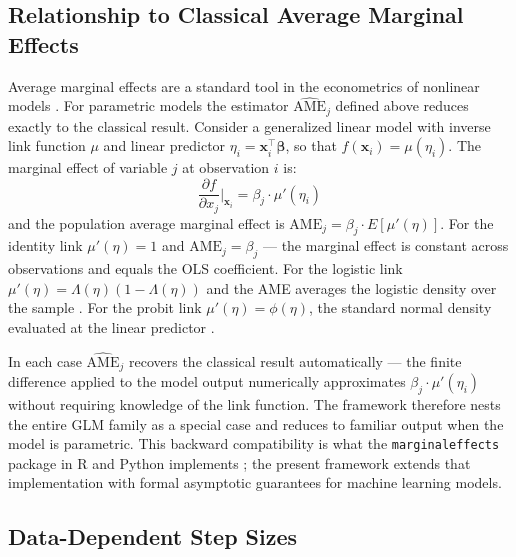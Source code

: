 \documentclass[12pt,a4paper]{article}
\numberwithin{equation}{section}
\theoremstyle{plain}
\theoremstyle{definition}
\begin{document}
	\subsection{Relationship to Classical Average Marginal Effects}

	
	Average marginal effects are a standard tool in the econometrics of nonlinear models \citep{greene2012, wooldridge2010}. For parametric models the estimator $\widehat{\mathrm{AME}}_j$ defined above reduces exactly to the classical result. Consider a generalized linear model with inverse link function $\mu$ and linear predictor $\eta_i = \mathbf{x}_i^\top \boldsymbol{\beta}$, so that $f(\mathbf{x}_i) = \mu(\eta_i)$. The marginal effect of variable $j$ at observation $i$ is:
	\begin{equation}
		\frac{\partial f}{\partial x_j}\bigg|_{\mathbf{x}_i} = \beta_j \cdot \mu'(\eta_i)
	\end{equation}
	and the population average marginal effect is $\mathrm{AME}_j = \beta_j \cdot E[\mu'(\eta)]$. For the identity link $\mu'(\eta) = 1$ and $\mathrm{AME}_j = \beta_j$ --- the marginal effect is constant across observations and equals the OLS coefficient. For the logistic link $\mu'(\eta) = \Lambda(\eta)(1 - \Lambda(\eta))$ and the AME averages the logistic density over the sample \citep{greene2012}. For the probit link $\mu'(\eta) = \phi(\eta)$, the standard normal density evaluated at the linear predictor \citep{wooldridge2010}.
	
	In each case $\widehat{\mathrm{AME}}_j$ recovers the classical result automatically --- the finite difference applied to the model output numerically approximates $\beta_j \cdot \mu'(\eta_i)$ without requiring knowledge of the link function. The framework therefore nests the entire GLM family as a special case and reduces to familiar output when the model is parametric. This backward compatibility is what the \texttt{marginaleffects} package in R and Python implements \citep{arelbundock2024marginaleffects}; the present framework extends that implementation with formal asymptotic guarantees for machine learning models.
	
	\subsection{Data-Dependent Step Sizes}
\end{document}
